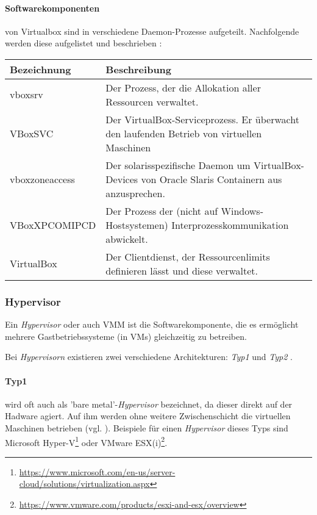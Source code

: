 \paragraph{Softwarekomponenten} von Virtualbox sind in verschiedene Daemon-Prozesse aufgeteilt.
Nachfolgende werden diese aufgelistet und beschrieben \cite{victor10}: %

    \begin{tabularx}{\textwidth}{|l||X|}
    \hline
      \textbf{Bezeichnung} & \textbf{Beschreibung} \\
    \hline
    \hline
      vboxsrv & Der Prozess, der die Allokation aller Ressourcen verwaltet. \\
    \hline
    \hline
      VBoxSVC & Der VirtualBox-Serviceprozess. Er überwacht den laufenden Betrieb von virtuellen Maschinen \\
    \hline
    \hline
      vboxzoneaccess & Der solarisspezifische Daemon um VirtualBox-Devices von Oracle Slaris Containern aus anzusprechen. \\
    \hline
    \hline
      VBoxXPCOMIPCD & Der Prozess der (nicht auf Windows-Hostsystemen) Interprozesskommunikation abwickelt. \\
    \hline
    \hline
      VirtualBox & Der Clientdienst, der Ressourcenlimits definieren lässt und diese verwaltet. \\
    \hline
    \end{tabularx}%

\subsubsection{Hypervisor}
\label{subsubsec:hypervisor}
Ein \textit{Hypervisor} oder auch \ac{VMM} ist die Softwarekomponente, die es ermöglicht
mehrere Gastbetriebssysteme (in VMs) gleichzeitig zu betreiben.

Bei \textit{Hypervisorn} existieren zwei verschiedene Architekturen: \textit{Typ1} und
\textit{Typ2} \cite{dash13}.

\paragraph{Typ1} wird oft auch als 'bare metal'-\textit{Hypervisor} bezeichnet, da dieser direkt
auf der Hadware agiert. Auf ihm werden ohne weitere Zwischenschicht die virtuellen Maschinen
betrieben (vgl. ).
Beispiele für einen \textit{Hypervisor} dieses Typs sind Microsoft Hyper-V\footnote{\url{https://www.microsoft.com/en-us/server-cloud/solutions/virtualization.aspx}}
oder VMware ESX(i)\footnote{\url{https://www.vmware.com/products/esxi-and-esx/overview}}.

